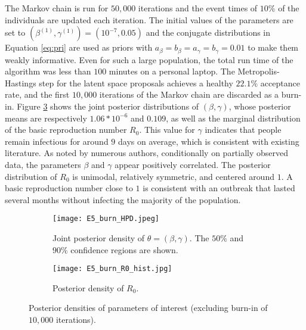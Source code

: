 \documentclass[11pt]{article}
\begin{document}
	The Markov chain is run for $50,000$ iterations and the event times of $10\%$ of the individuals are updated each iteration. The initial values of the parameters are set to $(\beta^{(1)}, \gamma^{(1)}) = (10^{-7}, 0.05)$ and the conjugate distributions in Equation \ref{eq:pri} are used as priors with $a_{\beta} = b_{\beta} = a_{\gamma} = b_{\gamma} = 0.01$ to make them weakly informative. Even for such a large population, the total run time of the algorithm was less than $100$ minutes on a personal laptop.
	The Metropolis-Hastings step for the latent space proposals achieves a healthy $22.1\%$ acceptance rate, and the first $10,000$ iterations of the Markov chain are discarded as a burn-in.
	Figure \ref{fig:ebola} shows the joint posterior distributions of $(\beta, \gamma)$, whose posterior means are respectively $1.06 * 10^{-6}$ and $0.109$, as well as the marginal distribution of the basic reproduction number $R_0$. This value for $\gamma$ indicates that people remain infectious for around $9$ days on average, which is consistent with existing literature. As noted by numerous authors, conditionally on partially observed data, the parameters $\beta$ and $\gamma$ appear positively correlated. The posterior distribution of $R_0$ is unimodal, relatively symmetric, and centered around $1$. A basic reproduction number close to $1$ is consistent with an outbreak that lasted several months without infecting the majority of the population.
	
	\begin{figure}
		\centering
		\begin{subfigure}[b]{0.45\textwidth}
			\centering
			\texttt{[image: E5\_burn\_HPD.jpeg]}
			\caption{Joint posterior density of $\theta = (\beta, \gamma)$. The $50\%$ and $90\%$ confidence regions are shown.}
			\label{fig:density_joint}
		\end{subfigure}
		\hfill
		\begin{subfigure}[b]{0.49\textwidth}
			\centering
			\texttt{[image: E5\_burn\_R0\_hist.jpg]}
			\caption{Posterior density of $R_0$.}
			\label{fig:density_R0}
		\end{subfigure}
		\caption{Posterior densities of parameters of interest (excluding burn-in of $10,000$ iterations).}
		\label{fig:ebola}
	\end{figure}
	
\end{document}
